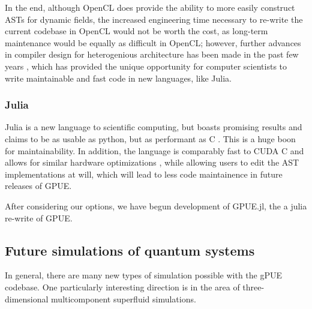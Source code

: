 In the end, although OpenCL does provide the ability to more easily construct ASTs for dynamic fields, the increased engineering time necessary to re-write the current codebase in OpenCL would not be worth the cost, as long-term maintenance would be equally as difficult in OpenCL; however, further advances in compiler design for heterogenious architecture has been made in the past few years \cite{besard2019}, which has provided the unique opportunity for computer scientists to write maintainable and fast code in new languages, like Julia.

\subsubsection{Julia}
Julia is a new language to scientific computing, but boasts promising results and claims to be as usable as python, but as performant as C .
This is a huge boon for maintainability.
In addition, the language is comparably fast to CUDA C and allows for similar hardware optimizations \cite{besard2016, besard2018}, while allowing users to edit the AST implementations at will, which will lead to less code maintainence in future releases of GPUE.

After considering our options, we have begun development of GPUE.jl, the a julia re-write of GPUE.

\subsection{Future simulations of quantum systems}

In general, there are many new types of simulation possible with the gPUE codebase.
One particularly interesting direction is in the area of three-dimensional multicomponent superfluid simulations.
